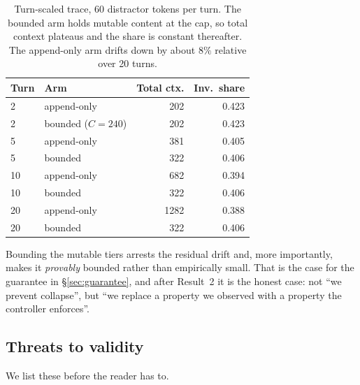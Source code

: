 \documentclass[11pt,a4paper]{article}
\theoremstyle{plain}
\theoremstyle{definition}
\theoremstyle{remark}
\begin{document}
\begin{table}[ht]
\centering
\small
\begin{tabular}{llrr}
\toprule
\textbf{Turn} & \textbf{Arm} & \textbf{Total ctx.} & \textbf{Inv.\ share} \\
\midrule
2  & append-only   & 202  & 0.423 \\
2  & bounded ($C{=}240$) & 202  & 0.423 \\
5  & append-only   & 381  & 0.405 \\
5  & bounded       & 322  & 0.406 \\
10 & append-only   & 682  & 0.394 \\
10 & bounded       & 322  & 0.406 \\
20 & append-only   & 1282 & 0.388 \\
20 & bounded       & 322  & 0.406 \\
\bottomrule
\end{tabular}
\caption{Turn-scaled trace, 60 distractor tokens per turn. The bounded arm holds
mutable content at the cap, so total context plateaus and the share is constant
thereafter. The append-only arm drifts down by about $8\%$ relative over 20
turns.}
\label{tab:turns}
\end{table}

Bounding the mutable tiers arrests the residual drift and, more importantly,
makes it \emph{provably} bounded rather than empirically small. That is the case
for the guarantee in \S\ref{sec:guarantee}, and after Result~2 it is the honest
case: not ``we prevent collapse'', but ``we replace a property we observed with a
property the controller enforces''.

\subsection{Threats to validity}

We list these before the reader has to.
\end{document}
